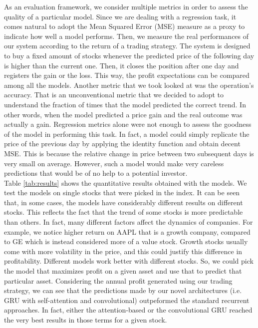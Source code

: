 \documentclass{article}
\begin{document}
As an evaluation framework, we consider multiple metrics in order to assess the quality
of a particular model. Since we are dealing with a regression task, it comes natural
to adopt the Mean Squared Error (MSE) measure as a proxy to indicate how well a model
performs. Then, we measure the real performances
of our system according to the return of a trading strategy. The system is
designed to buy a fixed amount of stocks whenever the predicted price of
the following day is higher than the current one. Then, it closes the position after one
day and registers the gain or the loss. This way, the profit expectations can be compared
among all the models. Another metric that we took looked at was the operation's
accuracy. That is an unconventional metric that we decided to adopt to understand the
fraction of times that the model predicted the correct trend. In other words, when the model
predicted a price gain and the real outcome was actually a gain.
Regression metrics alone were not enough
to assess the goodness of the model in performing this task. In fact, a model could
simply replicate the price of the previous day by applying the identity function and obtain
decent MSE. This is because the relative change in price between two subsequent days is
very small on average. However, such a model would make very careless predictions that
would be of no help to a potential investor. \\
Table \ref{tab:results} shows the quantitative results obtained with the models.
We test the models on single stocks that were picked in the index. It can be seen that, in some cases,
the models have considerably different results on different stocks. This reflects the fact that the trend
of some stocks is more predictable than others. In fact, many different factors affect the dynamics of companies.
For example, we notice higher return on AAPL that is a growth company, compared to GE which is instead
considered more of a value stock. Growth stocks usually come with more volatility in the price, and this could
justify this difference in profitability. Different models work better with different stocks. So,
we could pick the model that maximizes profit on a given asset and use that to predict
that particular asset.
Considering the annual profit generated using our trading strategy,
we can see that the predictions made by our novel architectures (i.e. GRU with self-attention
and convolutional) outpeformed the standard recurrent approaches. In fact, either the attention-based
or the convolutional GRU reached the very best results in those terms for a given stock.
\end{document}
